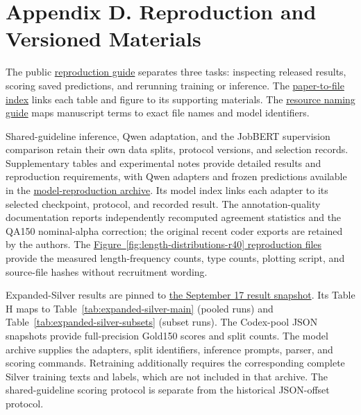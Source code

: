 \section{Appendix D. Reproduction and Versioned Materials}
\label{app:d}
\label{sec:extension-provenance}
\label{sec:display-archive-r14}

The public \href{https://github.com/AlfredJamesLi/chinese-skillspan-benchmark/blob/main/REPRODUCIBILITY.md}{reproduction guide} separates three tasks: inspecting released results, scoring saved predictions, and rerunning training or inference. The \href{https://github.com/AlfredJamesLi/chinese-skillspan-benchmark/blob/main/reproduction/PAPER_INDEX.md}{paper-to-file index} links each table and figure to its supporting materials. The \href{https://github.com/AlfredJamesLi/chinese-skillspan-benchmark/blob/main/PAPER_NAMES.md}{resource naming guide} maps manuscript terms to exact file names and model identifiers.

Shared-guideline inference, Qwen adaptation, and the JobBERT supervision comparison retain their own data splits, protocol versions, and selection records. Supplementary tables and experimental notes provide detailed results and reproduction requirements, with Qwen adapters and frozen predictions available in the \href{https://doi.org/10.5281/zenodo.22851581}{model-reproduction archive}. Its model index links each adapter to its selected checkpoint, protocol, and recorded result. The annotation-quality documentation reports independently recomputed agreement statistics and the QA150 nominal-alpha correction; the original recent coder exports are retained by the authors. The \href{https://github.com/AlfredJamesLi/chinese-skillspan-benchmark/tree/main/reproduction/benchmark_profile}{Figure~\ref{fig:length-distributions-r40} reproduction files} provide the measured length-frequency counts, type counts, plotting script, and source-file hashes without recruitment wording.

Expanded-Silver results are pinned to \href{https://github.com/AlfredJamesLi/chinese-skillspan-benchmark/commit/11355ff567d647cb087b0f033e09fd0825dac3c4}{the September 17 result snapshot}. Its Table H maps to Table~\ref{tab:expanded-silver-main} (pooled runs) and Table~\ref{tab:expanded-silver-subsets} (subset runs). The Codex-pool JSON snapshots provide full-precision Gold150 scores and split counts. The model archive supplies the adapters, split identifiers, inference prompts, parser, and scoring commands. Retraining additionally requires the corresponding complete Silver training texts and labels, which are not included in that archive. The shared-guideline scoring protocol is separate from the historical JSON-offset protocol.

